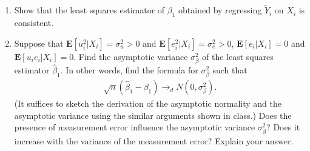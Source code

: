 \documentclass[11pt]{article}
\newcommand{\Blue}{\color{blue}}
\begin{document}
\begin{enumerate}
\begin{enumerate}
\bigskip

\item  Show that the least squares estimator of $\beta_1$ obtained by regressing $\tilde Y_i$ on $X_i$ is consistent.\bigskip



\item  Suppose that $\mathbf{E}[u_i^2|X_i] = \sigma_u^2>0$ and $\mathbf{E}[e_i^2|X_i] = \sigma_e^2>0$, $\mathbf{E}[e_i|X_i]=0$ and $\mathbf{E}[u_i e_i|X_i]=0$. Find the asymptotic variance $\sigma^2_\beta$ of the least squares estimator $\hat \beta_1$. In other words, find the formula for $\sigma^2_\beta$ such that
\begin{eqnarray*}
	\sqrt{n}(\hat \beta_1 -\beta_1) \rightarrow_d N(0,\sigma_\beta^2).
\end{eqnarray*}
(It suffices to sketch the derivation of the asymptotic normality and the asymptotic variance using the similar arguments shown in class.) Does the presence of measurement error influence the asymptotic variance $\sigma_\beta^2$? Does it increase with the variance of the measurement error? Explain your answer.
\end{enumerate}
\bigskip


\end{enumerate}
\end{document}
